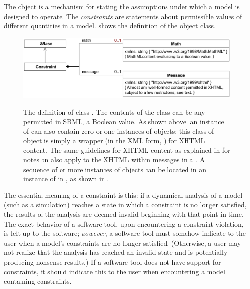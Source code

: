 The \Constraint object is a mechanism for stating the
assumptions under which a model is designed to operate.  The
\emph{constraints} are statements about permissible values of
different quantities in a model.  
shows the definition of the \Constraint object class.

\begin{figure}[htb]
  \centering
  \small
  \vspace*{2ex}
             {\includegraphics[scale=0.8]{figs/constraint-uml}}
  \caption{The definition of class \Constraint.  The contents of
    the \Math class can be any \mathml permitted in SBML,
     a Boolean value.  As shown above, an
    instance of \Constraint can also contain zero or one instances
    of \Message objects; this class of object is simply a wrapper
    (in the XML form, ) for
    XHTML content.  The same guidelines for XHTML content as
    explained in  for notes on \SBaseUpright also
    apply to the XHTML within messages in a \Constraint. A
    sequence of  or more instances of \Constraint objects can
    be located in an instance of \ListOfConstraints in \Model, as
    shown in \protect{}.}
  \label{fig:constraint}
\end{figure}

The essential meaning of a constraint is this: if a dynamical
analysis of a model (such as a simulation) reaches a state in
which a constraint is no longer satisfied, the results of the
analysis are deemed invalid beginning with that point in time.
The exact behavior of a software tool, upon encountering a
constraint violation, is left up to the software; \emph{however},
a software tool must somehow indicate to the user when a model's
constraints are no longer satisfied.  (Otherwise, a user may not
realize that the analysis has reached an invalid state and is
potentially producing nonsense results.)  If a software tool does
not have support for constraints, it should indicate this to the
user when encountering a model containing constraints.


